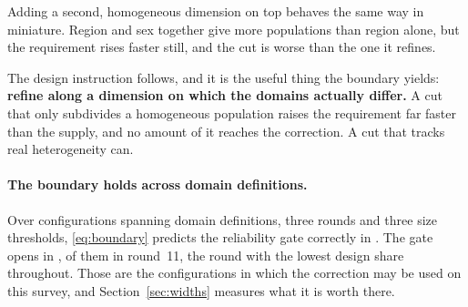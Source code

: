 Adding a second, homogeneous dimension on top behaves the same way in miniature.
Region and sex together give more populations than region alone, but the
requirement rises faster still, and the cut is worse than the one it refines.

The design instruction follows, and it is the useful thing the boundary yields:
\textbf{refine along a dimension on which the domains actually differ.} A cut
that only subdivides a homogeneous population raises the requirement far faster
than the supply, and no amount of it reaches the correction. A cut that tracks
real heterogeneity can.

\paragraph{The boundary holds across domain definitions.} Over \DomConfigs{}
configurations spanning \DomTypes{} domain definitions, three rounds and three
size thresholds, \eqref{eq:boundary} predicts the reliability gate correctly in
\DomCorrect. The gate opens in \DomOpen, \DomRoundEleven{} of them in round~11,
the round with the lowest design share throughout. Those are the configurations
in which the correction may be used on this survey, and
Section~\ref{sec:widths} measures what it is worth there.
